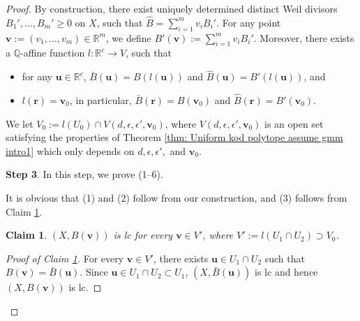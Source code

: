 \documentclass[11pt]{amsart}
\numberwithin{equation}{section}
\newcommand{\Qq}{\mathbb{Q}}
\newcommand{\Rr}{\mathbb{R}}
\newtheorem{claim}[thm]{Claim}
\theoremstyle{definition}
\theoremstyle{definition}
\begin{document}
\begin{proof}
By construction, there exist uniquely determined distinct Weil divisors $B_1',\dots, B_m'\geq 0$ on $X$, such that $\widehat B=\sum_{i=1}^mv_iB_i'$. For any point $\bm{v}:=(v_1,\dots,v_m)\in\Rr^m$, we define $B'(\bm{v}):=\sum_{i=1}^mv_iB_i'$. Moreover, there exists a $\Qq$-affine function $l: \Rr^c\rightarrow V$, such that
\begin{itemize}
    \item for any $\bm{u}\in\Rr^c$, $\bar B(\bm{u})=B(l(\bm{u}))$ and $\widehat B(\bm{u})=B'(l(\bm{u}))$, and
    \item $l(\bm{r})=\bm{v}_0$, in particular, $\bar B(\bm{r})=B(\bm{v}_0)$ and $\widehat B(\bm{r})=B'(\bm{v}_0)$.
\end{itemize}
We let $V_0:=l(U_0)\cap V(d,\epsilon,\epsilon',\bm{v}_0)$, where $V(d,\epsilon,\epsilon',\bm{v}_0)$ is an open set satisfying the properties of Theorem \ref{thm: Uniform kod polytope assume gmm intro1} which only depends on $d,\epsilon,\epsilon',$ and $\bm{v}_0$.

\medskip

\noindent\textbf{Step 3}. In this step, we prove (1--6). 

It is obvious that (1) and (2) follow from our construction, and (3) follows from Claim \ref{claim: xbbmv is lc for every bmv in u'}.

\begin{claim}\label{claim: xbbmv is lc for every bmv in u'}
$(X,B(\bm{v}))$ is lc for every $\bm{v}\in V'$, where $V':=l(U_1\cap U_2)\supset V_0$.
\end{claim}
\begin{proof}[Proof of Claim \ref{claim: xbbmv is lc for every bmv in u'}]
For every $\bm{v}\in V'$, there exists $\bm{u}\in U_1\cap U_2$ such that $B(\bm{v})=\bar B(\bm{u}).$ Since $\bm{u}\in U_1\cap U_2\subset U_1$, $(X,\bar B(\bm{u}))$ is lc and hence $(X,B(\bm{v}))$ is lc.
\end{proof}


\end{proof}
\end{document}
